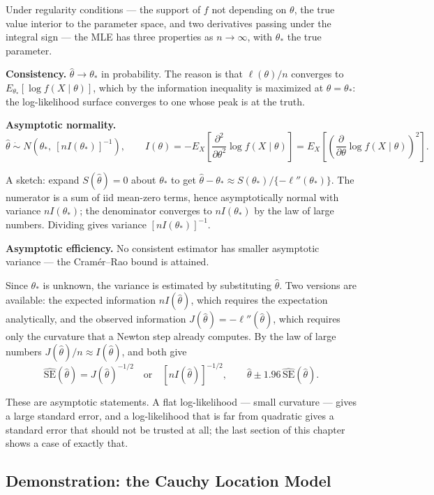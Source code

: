 \documentclass[
  letterpaper,
  DIV=11,
  numbers=noendperiod]{scrreprt}
\begin{document}
Under regularity conditions --- the support of \(f\) not depending on
\(\theta\), the true value interior to the parameter space, and two
derivatives passing under the integral sign --- the MLE has three
properties as \(n \to \infty\), with \(\theta_*\) the true parameter.

\textbf{Consistency.} \(\hat\theta \to \theta_*\) in probability. The
reason is that \(\ell(\theta)/n\) converges to
\(E_{\theta_*}[\log f(X \mid \theta)]\), which by the information
inequality is maximized at \(\theta = \theta_*\): the log-likelihood
surface converges to one whose peak is at the truth.

\textbf{Asymptotic normality.}
\[\hat\theta \;\dot\sim\; N\left(\theta_*,\ \left[n I(\theta_*)\right]^{-1}\right), \qquad I(\theta) = -E_X\left[\frac{\partial^{2}}{\partial\theta^{2}}\log f(X \mid \theta)\right] = E_X\left[\left(\frac{\partial}{\partial\theta}\log f(X\mid\theta)\right)^{2}\right].\]

A sketch: expand \(S(\hat\theta) = 0\) about \(\theta_*\) to get
\(\hat\theta - \theta_* \approx S(\theta_*)/\{-\ell''(\theta_*)\}\). The
numerator is a sum of iid mean-zero terms, hence asymptotically normal
with variance \(nI(\theta_*)\); the denominator converges to
\(nI(\theta_*)\) by the law of large numbers. Dividing gives variance
\([nI(\theta_*)]^{-1}\).

\textbf{Asymptotic efficiency.} No consistent estimator has smaller
asymptotic variance --- the Cramér--Rao bound is attained.

Since \(\theta_*\) is unknown, the variance is estimated by substituting
\(\hat\theta\). Two versions are available: the expected information
\(nI(\hat\theta)\), which requires the expectation analytically, and the
observed information \(J(\hat\theta) = -\ell''(\hat\theta)\), which
requires only the curvature that a Newton step already computes. By the
law of large numbers \(J(\hat\theta)/n \approx I(\hat\theta)\), and both
give
\[\widehat{\mathrm{SE}}(\hat\theta) = J(\hat\theta)^{-1/2} \quad\text{or}\quad \left[nI(\hat\theta)\right]^{-1/2}, \qquad \hat\theta \pm 1.96\,\widehat{\mathrm{SE}}(\hat\theta).\]

These are asymptotic statements. A flat log-likelihood --- small
curvature --- gives a large standard error, and a log-likelihood that is
far from quadratic gives a standard error that should not be trusted at
all; the last section of this chapter shows a case of exactly that.

\subsection{Demonstration: the Cauchy Location
Model}\label{demonstration-the-cauchy-location-model}
\end{document}
